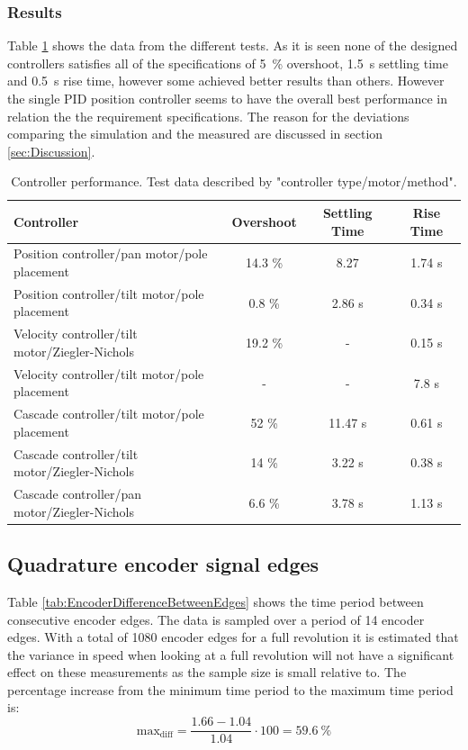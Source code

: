 \documentclass[../../main.tex]{subfiles}
\begin{document}
\subsubsection*{Results}
Table \ref{tab:controller_data} shows the data from the different tests. As it is seen none of the designed controllers satisfies all of the specifications of \SI{5}{\percent} overshoot, \SI{1,5}{\second} settling time and \SI{0,5}{\second} rise time, however some achieved better results than others. However the single PID position controller seems to have the overall best performance in relation the the requirement specifications. The reason for the deviations comparing the simulation and the measured are discussed in section \ref{sec:Discussion}.
\begin{table}[H]
    \centering
    \begin{tabular}{l|c c c}
         Controller & Overshoot & Settling Time  & Rise Time \\ \hline
         Position controller/pan motor/pole placement & 14.3 \% & 8.27 & 1.74 s \\
         Position controller/tilt motor/pole placement & 0.8 \% & 2.86 s & 0.34 s \\
         Velocity controller/tilt motor/Ziegler-Nichols & 19.2 \% & - & 0.15 s \\
         Velocity controller/tilt motor/pole placement & - & - & 7.8 s\\
         Cascade controller/tilt motor/pole placement & 52 \%  & 11.47 s  & 0.61 s\\
         Cascade controller/tilt motor/Ziegler-Nichols & 14 \% & 3.22 s & 0.38 s \\
         Cascade controller/pan motor/Ziegler-Nichols & 6.6 \% & 3.78 s & 1.13 s \\
         
    \end{tabular}
    \caption{Controller performance. Test data described by "controller type/motor/method".}
    \label{tab:controller_data}
\end{table}

\subsection{Quadrature encoder signal edges}
Table \ref{tab:EncoderDifferenceBetweenEdges} shows the time period between consecutive encoder edges. The data is sampled over a period of 14 encoder edges. With a total of 1080 encoder edges for a full revolution it is estimated that the variance in speed when looking at a full revolution will not have a significant effect on these measurements as the sample size is small relative to. The percentage increase from the minimum time period to the maximum time period is:
\begin{equation}
    \mathrm{max_{diff}} = \frac{1.66 - 1.04}{1.04} \cdot 100 = \SI{59.6}{\percent} 
\end{equation}
\end{document}
